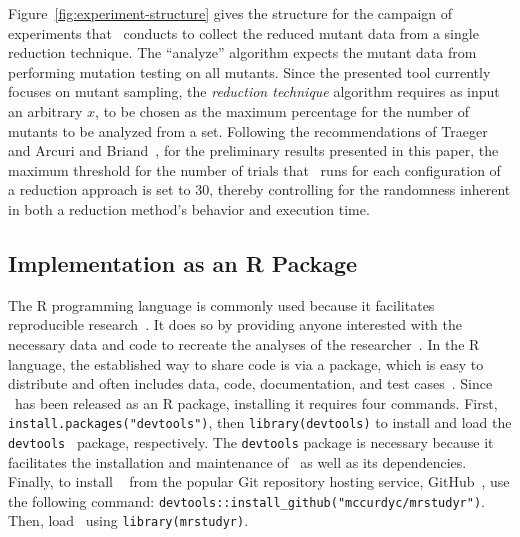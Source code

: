 Figure~\ref{fig:experiment-structure} gives the structure for the campaign of experiments that \mr~conducts to collect
the reduced mutant data from a single reduction technique. The ``analyze'' algorithm expects the mutant data from
performing mutation testing on all mutants. Since the presented tool currently focuses on mutant sampling, the
\textit{reduction technique} algorithm requires as input an arbitrary $x$, to be chosen as the maximum percentage for
the number of mutants to be analyzed from a set. Following the recommendations of Traeger~\etal~\cite{traeger2008nine}
and Arcuri and Briand~\cite{arcuri2014hitchhiker}, for the preliminary results presented in this paper, the maximum
threshold for the number of trials that \mr~runs for each configuration of a reduction approach is set to 30, thereby
controlling for the randomness inherent in both a reduction method's behavior and execution time.

\subsection{Implementation as an R Package}


The R programming language is commonly used because it facilitates reproducible research~\cite{Kapfhammer2011,
Kapfhammer2016}. It does so by providing anyone interested with the necessary data and code to recreate the analyses of
the researcher~\cite{gentleman2012statistical}. In the R language, the established way to share code is via a package,
which is easy to distribute and often includes data, code, documentation, and test cases~\cite{Kapfhammer2016,
wickham2015r}. Since \mr~has been released as an R package, installing it requires four commands. First,
\texttt{install.packages("devtools")}, then {\small\texttt{library(devtools)}} to install and load the
{\small\texttt{devtools}}~\cite{devtools} package, respectively. The \texttt{devtools} package is necessary because it
facilitates the installation and maintenance of \mr~as well as its dependencies. Finally, to install \mr~\cite{tool}
from the popular Git repository hosting service, GitHub~\cite{github}, use the following command:
{\small\texttt{devtools::install\_github("mccurdyc/mrstudyr")}}. Then, load \mr~using \texttt{library(mrstudyr)}.


